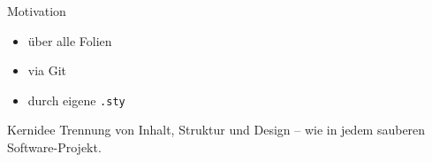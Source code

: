 \begin{frame}{Motivation}
  \begin{itemize}
    \item {} über alle Folien
    \item {} via Git
    \item {} durch eigene \texttt{.sty}
  \end{itemize}


  \begin{block}{Kernidee}
    Trennung von Inhalt, Struktur und Design – wie in jedem
    sauberen Software-Projekt.
  \end{block}
\end{frame}